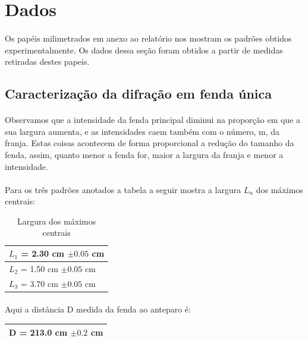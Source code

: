 \documentclass[a4paper,11pt]{article}
\begin{document}
\section{Dados}
\paragraph{}Os papéis milimetrados em anexo ao relatório nos
mostram os padrões obtidos experimentalmente.
Os dados dessa seção foram obtidos a partir de medidas retiradas
destes papeis.
\subsection{Caracterização da difração em fenda única}


\paragraph{}Observamos que a intensidade da fenda principal diminui na
proporção em que a sua largura aumenta, e as intensidades
caem também com o número, m, da franja. Estas coisas
acontecem de forma proporcional a redução do tamanho da
fenda, assim, quanto menor a fenda for, maior a largura da
franja e menor a intensidade.   

\paragraph{}
Para os três padrões anotados a tabela a seguir mostra a largura $L_n$
dos máximos centrais:

\begin{table}[!htp]
    \centering
    \begin{tabular}{|l|}\hline
      $L_1$ = 2.30 cm $\pm 0.05$ cm\\ \hline
      $L_2$ = 1.50 cm $\pm 0.05$ cm\\ \hline
      $L_3$ = 3.70 cm $\pm 0.05$ cm\\ \hline
    \end{tabular}
\caption{Largura dos máximos centrais}
\end{table}


\paragraph{}Aqui a distância D medida da fenda ao anteparo é:
\begin{table}[!htp]
    \centering
    \begin{tabular}{|l|}\hline
      D = 213.0 cm $\pm 0.2$ cm\\ \hline
    \end{tabular}
\end{table}
\end{document}
